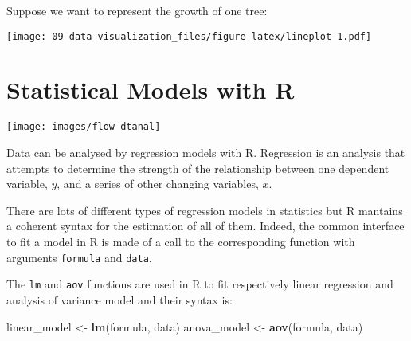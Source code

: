 \documentclass[]{book}
\newenvironment{Shaded}{\begin{snugshade}}{\end{snugshade}}
\newcommand{\KeywordTok}[1]{\textcolor[rgb]{0.13,0.29,0.53}{\textbf{{#1}}}}
\newcommand{\DataTypeTok}[1]{\textcolor[rgb]{0.13,0.29,0.53}{{#1}}}
\newcommand{\DecValTok}[1]{\textcolor[rgb]{0.00,0.00,0.81}{{#1}}}
\newcommand{\FloatTok}[1]{\textcolor[rgb]{0.00,0.00,0.81}{{#1}}}
\newcommand{\StringTok}[1]{\textcolor[rgb]{0.31,0.60,0.02}{{#1}}}
\newcommand{\CommentTok}[1]{\textcolor[rgb]{0.56,0.35,0.01}{\textit{{#1}}}}
\newcommand{\NormalTok}[1]{{#1}}
\begin{document}
Suppose we want to represent the growth of one tree:

\begin{Shaded}
\end{Shaded}

\texttt{[image: 09-data-visualization\_files/figure-latex/lineplot-1.pdf]}

\chapter{Statistical Models with R}\label{statistical-models-with-r}

\texttt{[image: images/flow-dtanal]}

Data can be analysed by regression models with R. Regression is an
analysis that attempts to determine the strength of the relationship
between one dependent variable, \(y\), and a series of other changing
variables, \(x\).

There are lots of different types of regression models in statistics but
R mantains a coherent syntax for the estimation of all of them. Indeed,
the common interface to fit a model in R is made of a call to the
corresponding function with arguments \texttt{formula} and
\texttt{data}.

The \texttt{lm} and \texttt{aov} functions are used in R to fit
respectively linear regression and analysis of variance model and their
syntax is:

\begin{Shaded}
\begin{Highlighting}[]
\NormalTok{linear_model <-}\StringTok{ }\KeywordTok{lm}\NormalTok{(formula, data)}
\NormalTok{anova_model <-}\StringTok{ }\KeywordTok{aov}\NormalTok{(formula, data)}
\end{Highlighting}
\end{Shaded}
\end{document}
